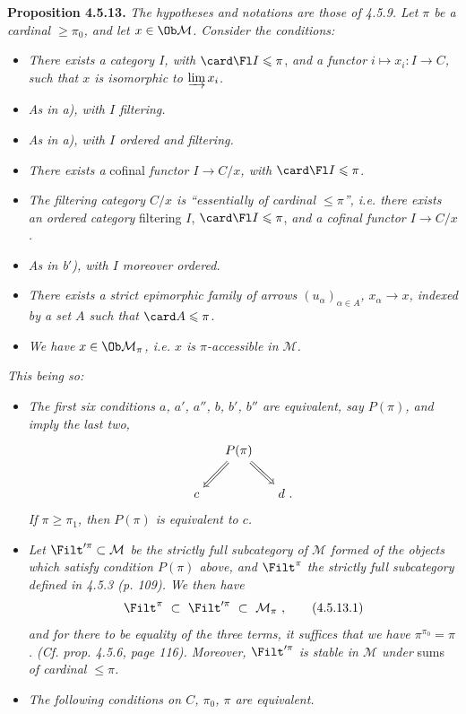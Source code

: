 \textbf{Proposition 4.5.13.} \textit{The hypotheses and notations are those of 4.5.9. Let $\pi$ be a cardinal $\geqslant \pi_0$, and let $x \in \Ob \mathcal{M}$. Consider the conditions:}
\begin{itemize}[leftmargin=3em]
\item[\textit{a})] \textit{There exists a category $I$, with} $\card \Fl I \leqslant \pi$, \textit{and a functor $i \longmapsto x_i : I \longrightarrow C$, such that $x$ is isomorphic to $\varinjlim x_i$.}
\item[\textit{a}$'$)] \textit{As in a), with $I$ filtering.}
\item[\textit{a}$''$)] \textit{As in a), with $I$ ordered and filtering.}
\item[\textit{b})] \textit{There exists a} cofinal \textit{functor $I \longrightarrow C/x$, with} $\card \Fl I \leqslant \pi$.
\item[\textit{b}$'$)] \textit{The filtering category $C/x$ is ``essentially of cardinal $\leqslant \pi$'', i.e. there exists an ordered category} filtering $I$, $\card \Fl I \leqslant \pi$, \textit{and a cofinal functor $I \longrightarrow C/x$.}
\item[\textit{b}$''$)] \textit{As in b$'$), with $I$ moreover ordered.}
\item[\textit{c})] \textit{There exists a strict epimorphic family of arrows $(u_\alpha)_{\alpha \in A}$, $x_\alpha \longrightarrow x$, indexed by a set $A$ such that} $\card A \leqslant \pi$.
\item[\textit{d})] \textit{We have $x \in \Ob \mathcal{M}_\pi$, i.e. $x$ is $\pi$-accessible in $\mathcal{M}$.}
\end{itemize}


\textit{This being so:}
\begin{itemize}[leftmargin=3em]
\item[\circled{1\textsuperscript{\textit{o}}}] \textit{The first six conditions $a$, $a'$, $a''$, $b$, $b'$, $b''$ are equivalent, say $P(\pi)$, and imply the last two,}
\[
\begin{tikzcd}[column sep=small]
 & P(\pi) \arrow[dl, Rightarrow] \arrow[dr, Rightarrow] & \\
c & & d \ .
\end{tikzcd}
\]
\textit{If $\pi \geqslant \pi_1$, then $P(\pi)$ is equivalent to $c$.}
\item[\circled{2\textsuperscript{\textit{o}}}] \textit{Let $\Filt'^{\pi} \subset \mathcal{M}$ be the strictly full subcategory of $\mathcal{M}$ formed of the objects which satisfy condition $P(\pi)$ above, and $\Filt^\pi$ the strictly full subcategory defined in 4.5.3 (p. 109). We then have}
\[
\Filt^\pi \ \subset \ \Filt'^{\pi} \ \subset \ \mathcal{M}_\pi \ , \tag*{(4.5.13.1)}
\]
\textit{and for there to be equality of the three terms, it suffices that we have $\pi^{\pi_0} = \pi$. (Cf. prop. 4.5.6, page 116). Moreover, $\Filt'^{\pi}$ is stable in $\mathcal{M}$ under} sums \textit{of cardinal $\leqslant \pi$.}
\item[\circled{3\textsuperscript{\textit{o}}}] \textit{The following conditions on $C$, $\pi_0$, $\pi$ are equivalent.}
\end{itemize}